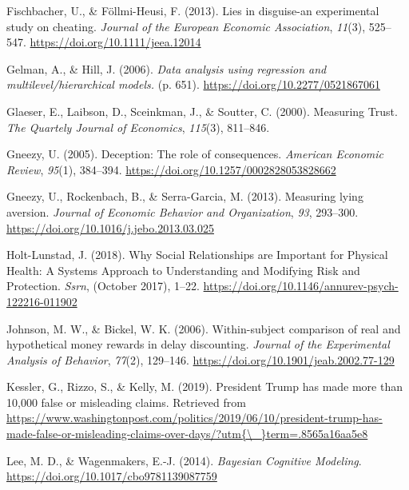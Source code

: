 \documentclass[12pt,]{article}
\begin{document}
\leavevmode\hypertarget{ref-Fischbacher2013a}{}%
Fischbacher, U., \& Föllmi-Heusi, F. (2013). Lies in disguise-an
experimental study on cheating. \emph{Journal of the European Economic
Association}, \emph{11}(3), 525--547.
\url{https://doi.org/10.1111/jeea.12014}

\leavevmode\hypertarget{ref-Gelman2006}{}%
Gelman, A., \& Hill, J. (2006). \emph{Data analysis using regression and
multilevel/hierarchical models.} (p. 651).
\url{https://doi.org/10.2277/0521867061}

\leavevmode\hypertarget{ref-Glaeser2000}{}%
Glaeser, E., Laibson, D., Sceinkman, J., \& Soutter, C. (2000).
Measuring Trust. \emph{The Quartely Journal of Economics},
\emph{115}(3), 811--846.

\leavevmode\hypertarget{ref-Gneezy2005}{}%
Gneezy, U. (2005). Deception: The role of consequences. \emph{American
Economic Review}, \emph{95}(1), 384--394.
\url{https://doi.org/10.1257/0002828053828662}

\leavevmode\hypertarget{ref-Gneezy2013}{}%
Gneezy, U., Rockenbach, B., \& Serra-Garcia, M. (2013). Measuring lying
aversion. \emph{Journal of Economic Behavior and Organization},
\emph{93}, 293--300. \url{https://doi.org/10.1016/j.jebo.2013.03.025}

\leavevmode\hypertarget{ref-Holt-Lunstad2018}{}%
Holt-Lunstad, J. (2018). Why Social Relationships are Important for
Physical Health: A Systems Approach to Understanding and Modifying Risk
and Protection. \emph{Ssrn}, (October 2017), 1--22.
\url{https://doi.org/10.1146/annurev-psych-122216-011902}

\leavevmode\hypertarget{ref-Johnson2006}{}%
Johnson, M. W., \& Bickel, W. K. (2006). Within-subject comparison of
real and hypothetical money rewards in delay discounting. \emph{Journal
of the Experimental Analysis of Behavior}, \emph{77}(2), 129--146.
\url{https://doi.org/10.1901/jeab.2002.77-129}

\leavevmode\hypertarget{ref-Kessler2019}{}%
Kessler, G., Rizzo, S., \& Kelly, M. (2019). President Trump has made
more than 10,000 false or misleading claims. Retrieved from
\href{https://www.washingtonpost.com/politics/2019/06/10/president-trump-has-made-false-or-misleading-claims-over-days/?utm\%7B/_\%7Dterm=.8565a16aa5e8}{https://www.washingtonpost.com/politics/2019/06/10/president-trump-has-made-false-or-misleading-claims-over-days/?utm\{\textbackslash{}\_\}term=.8565a16aa5e8}

\leavevmode\hypertarget{ref-Lee2014}{}%
Lee, M. D., \& Wagenmakers, E.-J. (2014). \emph{Bayesian Cognitive
Modeling}. \url{https://doi.org/10.1017/cbo9781139087759}
\end{document}
